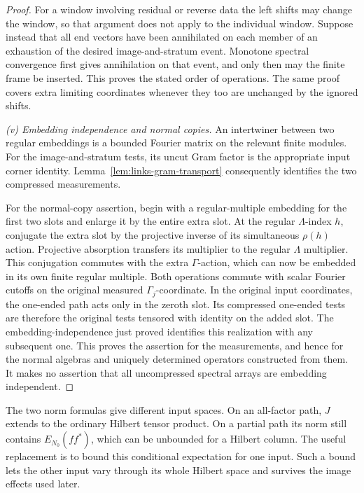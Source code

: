 \begin{proof}
For a window involving residual or reverse data the left shifts
may change the window, so that argument does not apply to the
individual window. Suppose instead that all end vectors have been
annihilated on each member of an exhaustion of the desired
image-and-stratum event. Monotone spectral convergence first gives
annihilation on that event, and only then may the finite frame be
inserted. This proves the stated order of operations. The same
proof covers extra limiting coordinates whenever they too are
unchanged by the ignored shifts.

\emph{(v) Embedding independence and normal copies.}
An intertwiner between two regular embeddings is a bounded Fourier
matrix on the relevant finite modules. For the image-and-stratum
tests, its uncut Gram factor is the appropriate input corner
identity. Lemma~\ref{lem:links-gram-transport} consequently
identifies the two compressed measurements.

For the normal-copy assertion, begin with a regular-multiple
embedding for the first two slots and enlarge it by the entire
extra slot. At the regular \(\Lambda\)-index \(h\), conjugate
the extra slot by the projective inverse of its simultaneous
\(\rho(h)\) action. Projective absorption transfers its
multiplier to the regular \(\Lambda\) multiplier. This conjugation
commutes with the extra \(\Gamma\)-action, which can now be
embedded in its own finite regular multiple. Both operations
commute with scalar Fourier cutoffs on the original measured
\(\Gamma_j\)-coordinate. In the original input coordinates,
the one-ended path acts only in the zeroth slot. Its compressed
one-ended tests are therefore the original tests tensored with
identity on the added slot. The embedding-independence just proved
identifies this realization with any subsequent one. This proves
the assertion for the measurements, and hence for the normal
algebras and uniquely determined operators constructed from them.
It makes no assertion that all uncompressed spectral arrays are
embedding independent.
\end{proof}

The two norm formulas give different input spaces. On an all-factor
path, $J$ extends to the ordinary Hilbert tensor product. On a partial
path its norm still contains $E_{N_0}(ff^*)$, which can be unbounded for
a Hilbert column. The useful replacement is to bound this conditional
expectation for one input. Such a bound lets the other input vary through
its whole Hilbert space and survives the image effects used later.

